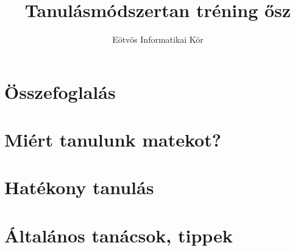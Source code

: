 \documentclass[12pt]{article}
\title{Tanulásmódszertan tréning ősz}
\author{Eötvös Informatikai Kör}
\date{ }
\begin{document}
\section{Összefoglalás}


\section{Miért tanulunk matekot?}


\section{Hatékony tanulás}


\section{Általános tanácsok, tippek}

\end{document}

